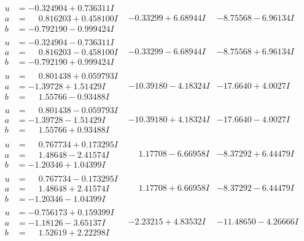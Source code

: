 \documentclass[1p]{elsarticle_modified}
\theoremstyle{definition}
\begin{document}
$$\begin{array}{c|c|c}
\begin{aligned}
u &= -0.324904 + 0.736311 I \\
a &= \phantom{-}0.816203 + 0.458100 I \\
b &= -0.792190 - 0.999424 I\end{aligned}
 & -0.33299 + 6.68944 I & -8.75568 - 6.96134 I \\ \hline\begin{aligned}
u &= -0.324904 - 0.736311 I \\
a &= \phantom{-}0.816203 - 0.458100 I \\
b &= -0.792190 + 0.999424 I\end{aligned}
 & -0.33299 - 6.68944 I & -8.75568 + 6.96134 I \\ \hline\begin{aligned}
u &= \phantom{-}0.801438 + 0.059793 I \\
a &= -1.39728 + 1.51429 I \\
b &= \phantom{-}1.55766 - 0.93488 I\end{aligned}
 & -10.39180 - 4.18324 I & -17.6640 + 4.0027 I \\ \hline\begin{aligned}
u &= \phantom{-}0.801438 - 0.059793 I \\
a &= -1.39728 - 1.51429 I \\
b &= \phantom{-}1.55766 + 0.93488 I\end{aligned}
 & -10.39180 + 4.18324 I & -17.6640 - 4.0027 I \\ \hline\begin{aligned}
u &= \phantom{-}0.767734 + 0.173295 I \\
a &= \phantom{-}1.48648 - 2.41574 I \\
b &= -1.20346 + 1.04399 I\end{aligned}
 & \phantom{-}1.17708 - 6.66958 I & -8.37292 + 6.44479 I \\ \hline\begin{aligned}
u &= \phantom{-}0.767734 - 0.173295 I \\
a &= \phantom{-}1.48648 + 2.41574 I \\
b &= -1.20346 - 1.04399 I\end{aligned}
 & \phantom{-}1.17708 + 6.66958 I & -8.37292 - 6.44479 I \\ \hline\begin{aligned}
u &= -0.756173 + 0.159399 I \\
a &= -1.18126 - 3.65137 I \\
b &= \phantom{-}1.52619 + 2.22298 I\end{aligned}
 & -2.23215 + 4.83532 I & -11.48650 - 4.26666 I \\ \hline\begin{aligned}

\end{aligned}
\end{array}$$
\end{document}
